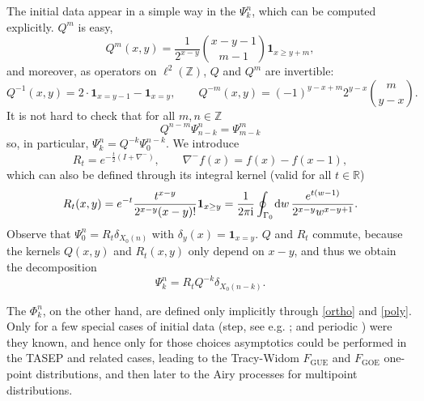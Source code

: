 \documentclass[letterpaper,reqno,11pt,oneside,final]{amsart}
\theoremstyle{definition}
\newcommand{\R}{R}
\newcommand{\I}{\uptext{i}}
\newcommand{\rr}{\mathbb{R}}
\newcommand{\zz}{\mathbb{Z}}
\newcommand{\uno}[1]{\mathbf{1}_{#1}}
\newcommand{\tsm}{\hspace{-0.1em}}
\newcommand{\uptext}[1]{\text{\upshape{#1}}}
\renewcommand{\d}{\mathrm{d}}
\numberwithin{equation}{section}
\begin{document}
The initial data appear in a simple way in the $\Psi_k^n$, which can be computed explicitly.  $Q^m$ is easy,
\begin{equation}
  Q^{m}(x,y)=\frac{1}{2^{x-y}}\binom{x-y-1}{m-1}\uno{x\ge y+m},\label{eq:Qpow}
\end{equation}
and moreover, as operators on $\ell^2(\zz)$,  $Q$ and $Q^m$ are invertible:
\begin{equation}\label{eq:Qinv}
  Q^{-1}(x,y)=2\cdot\uno{x=y-1}-\uno{x=y},\qquad Q^{-m}(x,y)=(-1)^{y-x+m}2^{y-x}\binom{m}{y-x}.
\end{equation}
It is not hard to check \cite[Eq. 3.22]{borFerPrahSasam} that for all $m,n\in \zz$
\begin{equation}
Q^{n-m}\Psi^n_{n-k}=\Psi^m_{m-k}\label{eq:QmnPsi}
\end{equation}
so, in particular, $\Psi^n_{k}=Q^{-k}\Psi^{n-k}_0$.
We introduce
\begin{equation}\label{def:rt}
\R_t= e^{-\frac{t}2( I + \nabla^-)},\qquad \nabla^-f(x) = f(x)-f(x-1),
\end{equation}  
which can also be defined through its integral kernel (valid for all $t\in\rr$)
\begin{equation}\label{eq:kernelrt}
R_t(x,y)=e^{-t}\frac{t^{x-y}}{2^{x-y}(x-y)!}\uno{x\geq y}=\frac{1}{2\pi \I} \oint_{\Gamma_0} \tsm \d w \,\frac{e^{t(w-1)}}{2^{x-y} w^{x - y +1}}.
\end{equation}
Observe that $\Psi^{n}_0=\R_t\delta_{X_0(n)}$ with $\delta_y(x)=\uno{x=y}$.
$Q$ and $R_t$ commute, because the kernels $Q(x,y)$ and $\R_t(x,y)$ only depend on $x-y$, and thus we obtain the decomposition
\begin{equation}\label{eq:Psi-n-chgd}
  \Psi^n_{k}=\R_tQ^{-k}\delta_{X_0(n-k)}.
\end{equation}

The $\Phi_k^n$, on the other hand, are defined only implicitly through \ref{ortho} and \ref{poly}.
Only for a few special cases of initial data (step, see e.g. \cite{dimers}; and periodic \cite{borFerPrahSasam,bfp,bfs}) were they known, and hence only for those choices asymptotics could be performed in the TASEP and related cases, leading to the Tracy-Widom $F_{\text{GUE}}$ and $F_{\text{GOE}}$ one-point distributions, and then later to the Airy processes for multipoint distributions.
\end{document}
